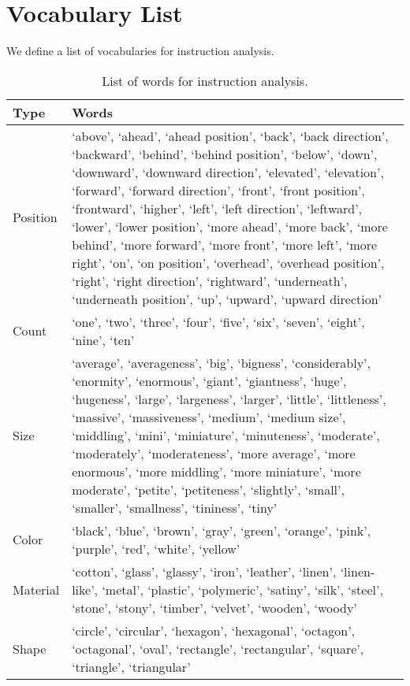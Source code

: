 \documentclass{article}
\begin{document}
\section{Vocabulary List} \label{appendix:vocab_list}

We define a list of vocabularies for instruction analysis.

\begin{table*}[h]
\small
\centering
\setlength{\tabcolsep}{8.pt}
\renewcommand{\arraystretch}{1.2}
\begin{tabular*}{\linewidth}{l|p{11cm}}
\toprule
\textbf{Type} & \textbf{Words} \\
\midrule
Position & `above', `ahead', `ahead position', `back', `back direction', `backward', `behind', `behind position', `below', `down', `downward', `downward direction', `elevated', `elevation', `forward', `forward direction', `front', `front position', `frontward', `higher', `left', `left direction', `leftward', `lower', `lower position', `more ahead', `more back', `more behind', `more forward', `more front', `more left', `more right', `on', `on position', `overhead', `overhead position', `right', `right direction', `rightward', `underneath', `underneath position', `up', `upward', `upward direction'\\
\midrule
Count & `one', `two', `three', `four', `five', `six', `seven', `eight', `nine', `ten'\\
\midrule
Size & `average', `averageness', `big', `bigness', `considerably', `enormity', `enormous', `giant', `giantness', `huge', `hugeness', `large', `largeness', `larger', `little', `littleness', `massive', `massiveness', `medium', `medium size', `middling', `mini', `miniature', `minuteness', `moderate', `moderately', `moderateness', `more average', `more enormous', `more middling', `more miniature', `more moderate', `petite', `petiteness', `slightly', `small', `smaller', `smallness', `tininess', `tiny'\\
\midrule
Color & `black', `blue', `brown', `gray', `green', `orange', `pink', `purple', `red', `white', `yellow'\\
\midrule
Material & `cotton', `glass', `glassy', `iron', `leather', `linen', `linen-like', `metal', `plastic', `polymeric', `satiny', `silk', `steel', `stone', `stony', `timber', `velvet', `wooden', `woody'\\
\midrule
Shape & `circle', `circular', `hexagon', `hexagonal', `octagon', `octagonal', `oval', `rectangle', `rectangular', `square', `triangle', `triangular'\\
\bottomrule
\end{tabular*}
\caption{List of words for instruction analysis. }
\label{tab:wordtype}
\end{table*} 
\end{document}
